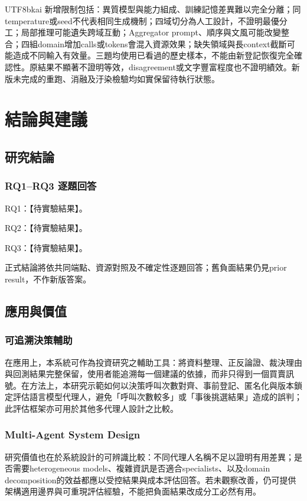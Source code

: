 \documentclass[12pt,a4paper]{article}
\begin{document}
\begin{CJK}{UTF8}{bkai}
新增限制包括：異質模型與能力組成、訓練記憶差異難以完全分離；同temperature或seed不代表相同生成機制；四域切分為人工設計，不證明最優分工；局部推理可能遺失跨域互動；Aggregator prompt、順序與文風可能改變整合；四組domain增加calls或tokens會混入資源效果；缺失領域與長context截斷可能造成不同輸入有效量。三題均使用已看過的歷史樣本，不能由新登記恢復完全確認性。原結果不顯著不證明等效，disagreement或文字豐富程度也不證明績效。新版未完成的重跑、消融及汙染檢驗均如實保留待執行狀態。

\section{結論與建議}

\subsection{研究結論}

\subsubsection{RQ1–RQ3 逐題回答}
RQ1：【待實驗結果】。

RQ2：【待實驗結果】。

RQ3：【待實驗結果】。

正式結論將依共同端點、資源對照及不確定性逐題回答；舊負面結果仍見prior result，不作新版答案。

\subsection{應用與價值}

\subsubsection{可追溯決策輔助}
在應用上，本系統可作為投資研究之輔助工具：將資料整理、正反論證、裁決理由與回測結果完整保留，使用者能追溯每一個建議的依據，而非只得到一個買賣訊號。在方法上，本研究示範如何以決策呼叫次數對齊、事前登記、匿名化與版本鎖定評估語言模型代理人，避免「呼叫次數較多」或「事後挑選結果」造成的誤判；此評估框架亦可用於其他多代理人設計之比較。
\subsubsection{Multi-Agent System Design}

研究價值也在於系統設計的可辨識比較：不同代理人名稱不足以證明有用差異；是否需要heterogeneous models、複雜資訊是否適合specialists、以及domain decomposition的效益都應以受控結果與成本評估回答。若未觀察改善，仍可提供架構適用邊界與可重現評估經驗，不能把負面結果改成分工必然有用。


\end{CJK}
\end{document}
